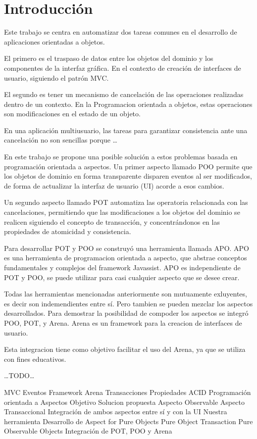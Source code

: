 \section{Introducción}

Este trabajo se centra en automatizar dos tareas comunes en el desarrollo
de aplicaciones orientadas a objetos.

El primero es el traspaso de datos entre los objetos del dominio y los componentes de la interfaz gráfica.
En el contexto de creación de interfaces de usuario, siguiendo el patrón MVC. 
 
El segundo es tener un mecanismo de cancelación de las operaciones realizadas dentro de un contexto.
En la Programacion orientada a objetos, estas operaciones son modificaciones en el estado de un objeto.

En una aplicación multiusuario, las tareas para garantizar consistencia ante una cancelación no
son sencillas porque \ldots 

En este trabajo se propone una posible solución a estos problemas basada en programación orientada a aspectos. 
Un primer aspecto llamado POO permite que los objetos de dominio en forma transparente disparen eventos al ser modificados,
de forma de actualizar la interfaz de usuario (UI) acorde a esos cambios. 

Un segundo aspecto llamado POT automatiza las operatoria relacionada con las cancelaciones, permitiendo que las modificaciones
a los objetos del dominio se realicen siguiendo el concepto de transacción, y concentrándonos en las
propiedades de atomicidad y consistencia.

Para desarrollar POT y POO se construyó una herramienta llamada APO.
APO es una herramienta de programacion orientada a aspecto, que abstrae conceptos fundamentales y complejos del 
framework Javassist. APO es independiente de POT y POO, se puede utilizar para casi cualquier aspecto que se desee crear.

Todas las herramientas mencionadas anteriormente son mutuamente exluyentes, es decir son indemendientes entre sí.
Pero tambien se pueden mezclar los aspectos desarrollados. Para demostrar la posibilidad de compoder los aspectos se integró
POO, POT, y Arena. Arena es un framework para la creacion de interfaces de usuario.

Esta integracion tiene como objetivo facilitar el uso del Arena, ya que se utiliza con fines educativos.
  

\ldots TODO\ldots

		MVC
		Eventos
		Framework Arena
	Transacciones
		Propiedades ACID
	Programación orientada a Aspectos
Objetivo
Solucion propuesta
	Aspecto Observable
 	Aspecto Transaccional
 	Integración de ambos aspectos entre sí y con la UI 
Nuestra herramienta
 	Desarrollo de Aspect for Pure Objects
 	Pure Object Transaction
 	Pure Observable Objects
 	Integración de POT, POO y Arena
